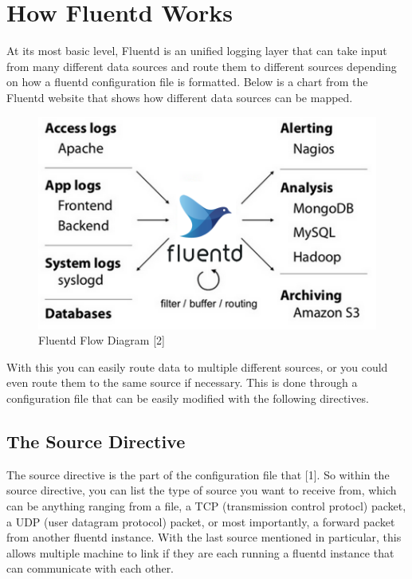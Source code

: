 \section{How Fluentd Works} \label{sec:works}
\quad \quad 
At its most basic level, Fluentd is an unified logging layer that can take input from many different
data sources and route them to different sources depending on how a fluentd configuration file is formatted. Below is a chart
from the Fluentd website that shows how different data sources can be mapped.
\begin{figure}[H]
    \centering
    \includegraphics[scale=0.75]{images/fluentd-architecture.png}
    \caption{Fluentd Flow Diagram [2]}
    \label{fig:picture}
\end{figure}
With this you can easily route data to multiple different sources, or you could even route them to the same source if necessary.
This is done through a configuration file that can be easily modified with the following directives.
\subsection{The Source Directive}
\quad \quad The source directive is the part of the configuration file that [1]. So within
the source directive, you can list the type of source you want to receive from, which can be anything ranging from a file, a TCP (transmission control protocl) packet,
a UDP (user datagram protocol) packet, or most importantly, a forward packet from another fluentd instance. With the last source mentioned in
particular, this allows multiple machine to link if they are each running a fluentd instance that can communicate with
each other.
